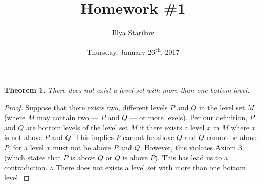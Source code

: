 \documentclass[12pt]{article}
\title{Homework \#1}
\date{Thursday, January 26\textsuperscript{th}, 2017}
\author{Illya Starikov}
\newtheorem{theorem}{Theorem}
\begin{document}
\maketitle



\begin{theorem}
    There does not exist a level set with more than one bottom level.
\end{theorem}

\begin{proof}
    Suppose that there exists two, different levels $P$ and $Q$ in the level set $M$ (where $M$ may contain two --- $P$ and $Q$ --- or more levels). Per our definition, $P$ and $Q$ are bottom levels of the level set $M$ if there exists a level $x$ in $M$ where $x$ is not above $P$ and $Q$. This implies $P$ cannot be above $Q$ and $Q$ cannot be above $P$, for a level $x$ must not be above $P$ and $Q$. However, this violates Axiom 3 (which states that $P$ is above $Q$ or $Q$ is above $P$). This has lead us to a contradiction. $\therefore$ There does not exists a level set with more than one bottom level.
\end{proof}
\end{document}
